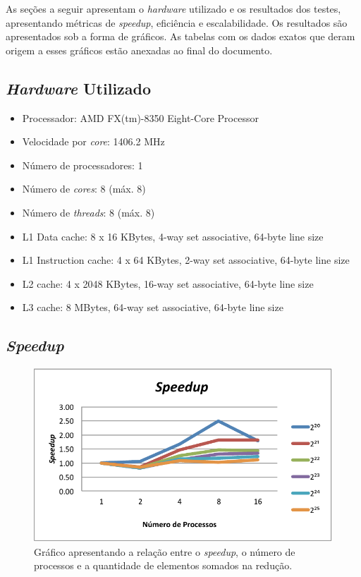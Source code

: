 \documentclass[12pt,a4paper]{article}
\begin{document}
As seções a seguir apresentam o \textit{hardware} utilizado e os resultados dos
testes, apresentando métricas de \textit{speedup}, eficiência e escalabilidade.
Os resultados são apresentados sob a forma de gráficos. As tabelas com os dados
exatos que deram origem a esses gráficos estão anexadas ao final do documento.


\subsection{\textit{Hardware} Utilizado}
\label{sec:hardware}

\begin{itemize}
    \item Processador: AMD FX(tm)-8350 Eight-Core Processor
    \item Velocidade por \textit{core}: 1406.2 MHz
    \item Número de processadores: 1
    \item Número de \textit{cores}: 8 (máx. 8)
    \item Número de \textit{threads}: 8 (máx. 8)
    \item L1 Data cache: 8 x 16 KBytes, 4-way set associative, 64-byte line size
    \item L1 Instruction cache: 4 x 64 KBytes, 2-way set associative, 64-byte line size
    \item L2 cache: 4 x 2048 KBytes, 16-way set associative, 64-byte line size
    \item L3 cache: 8 MBytes, 64-way set associative, 64-byte line size
\end{itemize}


\subsection{\textit{Speedup}}
\begin{figure}[h!]
\centering
\includegraphics{img/speedup.pdf}
\caption{Gráfico apresentando a relação entre o \textit{speedup}, o número de
processos e a quantidade de elementos somados na redução.}
\label{fig:speedup}
\end{figure}
\end{document}
